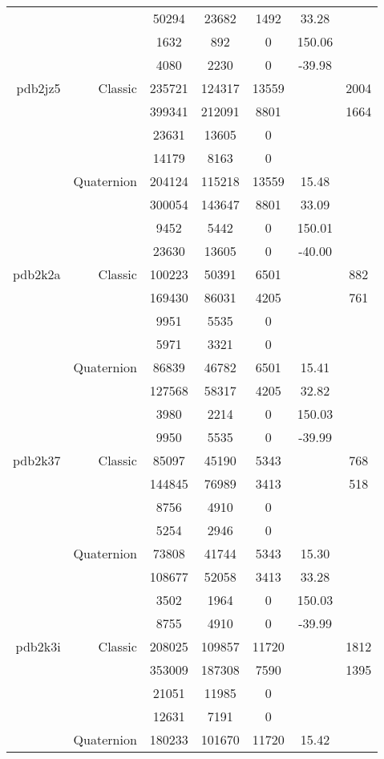 \begin{xltabular}{\textwidth}{r|rcccSc}
& & 50294 & 23682 & 1492 & 33.28 & \\
& & 1632 & 892 & 0 & 150.06 & \\
& & 4080 & 2230 & 0 & -39.98 & \\ \addlinespace
pdb2jz5 & Classic & 235721 & 124317 & 13559 & & 2004 \\
& & 399341 & 212091 & 8801 & & 1664 \\
& & 23631 & 13605 & 0 & & \\
& & 14179 & 8163 & 0 & & \\
& Quaternion & 204124 & 115218 & 13559 & 15.48 & \\
& & 300054 & 143647 & 8801 & 33.09 & \\
& & 9452 & 5442 & 0 & 150.01 & \\
& & 23630 & 13605 & 0 & -40.00 & \\ \addlinespace
pdb2k2a & Classic & 100223 & 50391 & 6501 & & 882 \\
& & 169430 & 86031 & 4205 & & 761 \\
& & 9951 & 5535 & 0 & & \\
& & 5971 & 3321 & 0 & & \\
& Quaternion & 86839 & 46782 & 6501 & 15.41 & \\
& & 127568 & 58317 & 4205 & 32.82 & \\
& & 3980 & 2214 & 0 & 150.03 & \\
& & 9950 & 5535 & 0 & -39.99 & \\ \addlinespace
pdb2k37 & Classic & 85097 & 45190 & 5343 & & 768 \\
& & 144845 & 76989 & 3413 & & 518 \\
& & 8756 & 4910 & 0 & & \\
& & 5254 & 2946 & 0 & & \\
& Quaternion & 73808 & 41744 & 5343 & 15.30 & \\
& & 108677 & 52058 & 3413 & 33.28 & \\
& & 3502 & 1964 & 0 & 150.03 & \\
& & 8755 & 4910 & 0 & -39.99 & \\ \addlinespace
pdb2k3i & Classic & 208025 & 109857 & 11720 & & 1812 \\
& & 353009 & 187308 & 7590 & & 1395 \\
& & 21051 & 11985 & 0 & & \\
& & 12631 & 7191 & 0 & & \\
& Quaternion & 180233 & 101670 & 11720 & 15.42 & \\

\end{xltabular}
